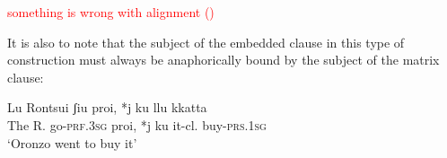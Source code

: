 \documentclass[output=paper]{langscibook}
\newcounter{lasttmp}    %
\newcommand{\Last}{\setcounter{lasttmp}{\value{equation}}(\thelasttmp)\xspace}
\begin{document}
\ea\label{ac17}
    \z
\z 

\textcolor{red}{something is wrong with alignment \Last}

It is also to note that the subject of the embedded clause in this type of construction must always be anaphorically bound by the subject of the matrix clause:

\ea \label{ac18}\gll Lu Rontsui   ʃiu        proi, *j  ku  llu    kkatta\\
  The R.     go-\textsc{prf}.\textsc{3sg}  proi, *j  ku  it-cl.  buy-\textsc{prs}.\textsc{1sg}  \\
  \glt ‘Oronzo went to buy it’
\z
\end{document}
